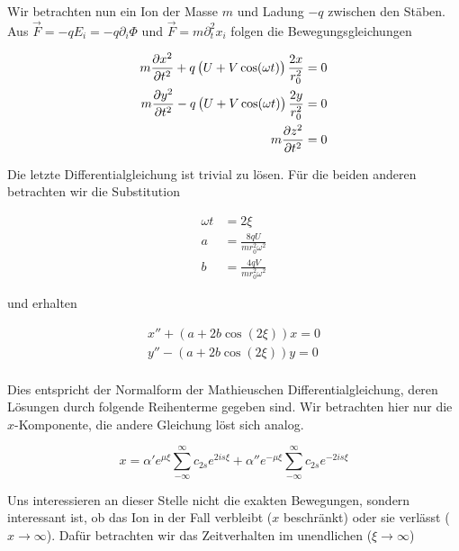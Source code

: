 \documentclass[a4paper,german,12pt,smallheadings]{scrartcl}
\newcommand\invisiblesection[1]{%
    \refstepcounter{section}%
      \addcontentsline{toc}{section}{\protect\numberline{\thesection}#1}%
        \sectionmark{#1}}
\begin{document}
Wir betrachten nun ein Ion der Masse $m$ und Ladung $-q$ zwischen den Stäben.
Aus $\vec{F} = -q E_i = -q \partial_i \Phi$ und $\vec{F} = m \partial_t^2 x_i$
folgen die Bewegungsgleichungen

\begin{align}
  m \frac{\partial x^2}{\partial t^2} + q \del{U + V \cos(\omega t)} \frac{2 x}{r_0^2} &= 0 \\
  m \frac{\partial y^2}{\partial t^2} - q \del{U + V \cos(\omega t)} \frac{2 y}{r_0^2} &= 0 \\
  m \frac{\partial z^2}{\partial t^2} &= 0
\end{align}

Die letzte Differentialgleichung ist trivial zu lösen. Für die beiden anderen
betrachten wir die Substitution

\begin{align}
  \omega t &= 2 \xi \\
  a &= \frac{8qU}{m r_0^2 \omega^2} \\
  b &= \frac{4qV}{m r_0^2 \omega^2}
\end{align}

und erhalten

\begin{align}
  x'' + (a + 2 b \cos(2 \xi)) x = 0 \\
  y'' - (a + 2 b \cos(2 \xi)) y = 0 \\
\end{align}

Dies entspricht der Normalform der Mathieuschen Differentialgleichung, deren
Lösungen durch folgende Reihenterme gegeben sind. Wir betrachten hier nur die
$x$-Komponente, die andere Gleichung löst sich analog.

\begin{equation}
  x = \alpha' e^{\mu \xi} \sum_{-\infty}^{\infty} c_{2s} e^{2is \xi} + \alpha'' e^{-\mu \xi} \sum_{-\infty}^{\infty} c_{2s} e^{-2is \xi}
\end{equation}

Uns interessieren an dieser Stelle nicht die exakten Bewegungen, sondern
interessant ist, ob das Ion in der Fall verbleibt ($x$ beschränkt) oder sie
verlässt ($x \to \infty$). Dafür betrachten wir das Zeitverhalten im unendlichen ($\xi \to \infty$)





%
%  
%
%
\end{document}
